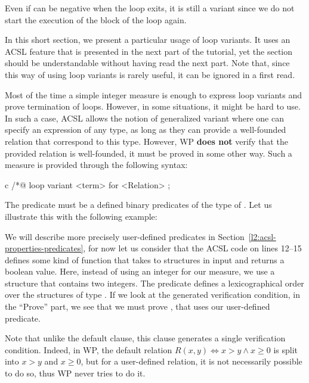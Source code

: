 Even if  can be negative when the loop exits, it is still
a variant since we do not start the execution of the block of the loop
again.


\label{l4:statements-loops-general-measure}


\begin{Information}
  In this short section, we present a particular usage of loop variants. It uses
  an ACSL feature that is presented in the next part of the tutorial, yet the
  section should be understandable without having read the next part. Note that,
  since this way of using loop variants is rarely useful, it can be ignored in a
  first read.
\end{Information}


Most of the time a simple integer measure is enough to express loop variants
and prove termination of loops. However, in some situations, it might be hard to
use. In such a case, ACSL allows the notion of generalized variant where one can
specify an expression of any type, as long as they can provide a well-founded
relation that correspond to this type. However, WP \textbf{does not} verify that
the provided relation is well-founded, it must be proved in some other way.
Such a measure is provided through the following syntax:


\begin{CodeBlock}{c}
/*@ loop variant <term> for <Relation> ;
\end{CodeBlock}


The  predicate must be a defined binary predicates of the
type of . Let us illustrate this with the following example:




We will describe more precisely user-defined predicates in
Section~\ref{l2:acsl-properties-predicates}, for now let us consider that
the ACSL code on lines 12--15 defines some kind of function that takes to
structures in input and returns a boolean value. Here, instead of using an
integer for our measure, we use a structure that contains two integers. The
 predicate defines a lexicographical order over the
structures of type . If we look at the generated verification
condition, in the ``Prove'' part, we see that we must prove
, that uses our user-defined predicate.


Note that unlike the default  clause, this clause
generates a single verification condition. Indeed, in WP, the default relation
$R(x,y) \Leftrightarrow x > y \wedge x \geq 0$ is split into $x > y$ and
$x \geq 0$, but for a user-defined relation, it is not necessarily possible to
do so, thus WP never tries to do it.


